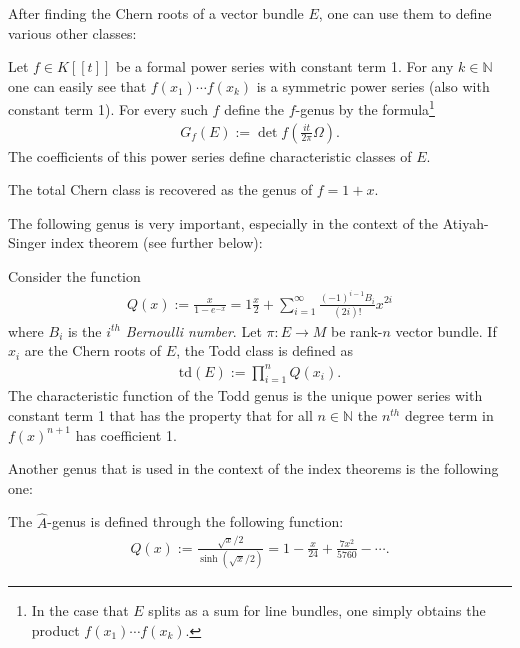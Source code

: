     After finding the Chern roots of a vector bundle $E$, one can use them to define various other classes:
    \begin{construct}[Genus]
        Let $f\in K[[t]]$ be a formal power series with constant term 1. For any $k\in\mathbb{N}$ one can easily see that $f(x_1)\cdots f(x_k)$ is a symmetric power series (also with constant term 1). For every such $f$ define the $f$-genus by the formula\footnote{In the case that $E$ splits as a sum for line bundles, one simply obtains the product $f(x_1)\cdots f(x_k)$.}
        \begin{gather}
            G_f(E) := \det f\left(\frac{it}{2\pi}\Omega\right).
        \end{gather}
        The coefficients of this power series define characteristic classes of $E$.
    \end{construct}

    \begin{example}
        The total Chern class is recovered as the genus of $f=1+x$.
    \end{example}

    The following genus is very important, especially in the context of the Atiyah-Singer index theorem (see further below):
    \begin{example}
        Consider the function
        \begin{gather}
            Q(x) := \frac{x}{1-e^{-x}} = 1 \frac{x}{2} + \sum_{i=1}^\infty\frac{(-1)^{i-1}B_i}{(2i)!}x^{2i}
        \end{gather}
        where $B_i$ is the $i^{th}$ \textit{Bernoulli number}. Let $\pi:E\rightarrow M$ be rank-$n$ vector bundle. If $x_i$ are the Chern roots of $E$, the Todd class is defined as
        \begin{gather}
            \text{td}(E) := \prod_{i=1}^nQ(x_i).
        \end{gather}
        The characteristic function of the Todd genus is the unique power series with constant term 1 that has the property that for all $n\in\mathbb{N}$ the $n^{th}$ degree term in $f(x)^{n+1}$ has coefficient 1.
    \end{example}
    Another genus that is used in the context of the index theorems is the following one:
    \begin{example}\label{diff:a_roof_genus}
        The $\hat{A}$-genus is defined through the following function:
        \begin{gather}
            Q(x) := \frac{\sqrt{x}/2}{\sinh(\sqrt{x}/2)} = 1 - \frac{x}{24} + \frac{7x^2}{5760} - \cdots.
        \end{gather}
    \end{example}

